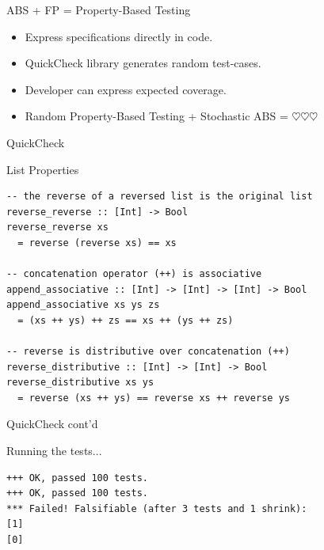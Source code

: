 \documentclass{beamer} %
\begin{document}
\begin{frame}{ABS + FP = Property-Based Testing}
  \begin{itemize}
    \item Express specifications directly in code.
    \item QuickCheck library generates random test-cases.
    \item Developer can express expected coverage.
    \item Random Property-Based Testing + Stochastic ABS = $\heartsuit \heartsuit \heartsuit$
  \end{itemize}
\end{frame}

\begin{frame}[fragile]{QuickCheck}
\begin{block}{List Properties}
\begin{verbatim}
-- the reverse of a reversed list is the original list
reverse_reverse :: [Int] -> Bool
reverse_reverse xs 
  = reverse (reverse xs) == xs

-- concatenation operator (++) is associative
append_associative :: [Int] -> [Int] -> [Int] -> Bool
append_associative xs ys zs 
  = (xs ++ ys) ++ zs == xs ++ (ys ++ zs)

-- reverse is distributive over concatenation (++)
reverse_distributive :: [Int] -> [Int] -> Bool
reverse_distributive xs ys 
  = reverse (xs ++ ys) == reverse xs ++ reverse ys
\end{verbatim}
\end{block}
\end{frame}

\begin{frame}[fragile]{QuickCheck cont'd}
\begin{block}{Running the tests...}
\begin{footnotesize}
\begin{verbatim}
+++ OK, passed 100 tests.
+++ OK, passed 100 tests.
*** Failed! Falsifiable (after 3 tests and 1 shrink):     
[1]
[0]
\end{verbatim}
\end{footnotesize}
\end{block}
\end{frame}
\end{document}
